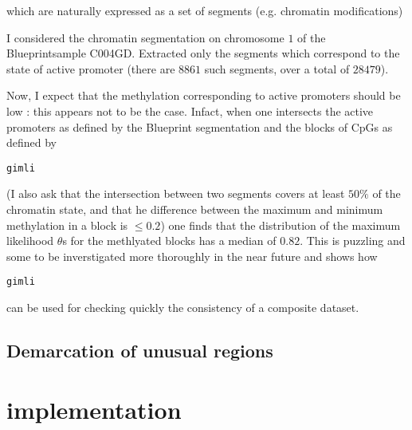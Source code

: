 \documentclass[11pt]{amsart}
\newcommand{\gimli}{\begin{verbatim}gimli\end{verbatim}}
\begin{document}
which are naturally expressed as a set of 
segments (e.g. chromatin modifications)

I considered the chromatin segmentation on chromosome $1$ of the
Blueprintsample C004GD. Extracted only the segments which correspond
to the state of active promoter (there are $8861$ such segments, over a total
of $28479$).

Now, I expect that the methylation corresponding to active promoters should be
low : this appears not to be the case. Infact, when one intersects the active
promoters as defined by the Blueprint segmentation and the blocks of CpGs as 
defined by \gimli (I also ask that the intersection between two segments covers
at least $50\%$ of the chromatin state, and that he difference between
the maximum and minimum methylation in a block is $\leq 0.2$) one finds
that the distribution of the maximum likelihood $\theta$s for the 
methlyated blocks has a median of $0.82$. This is puzzling and some 
to be inverstigated more thoroughly in the near future and shows how \gimli
can be used for checking quickly the consistency of a composite dataset.


\subsection{Demarcation of unusual regions} 



\section{implementation}



\end{document}
